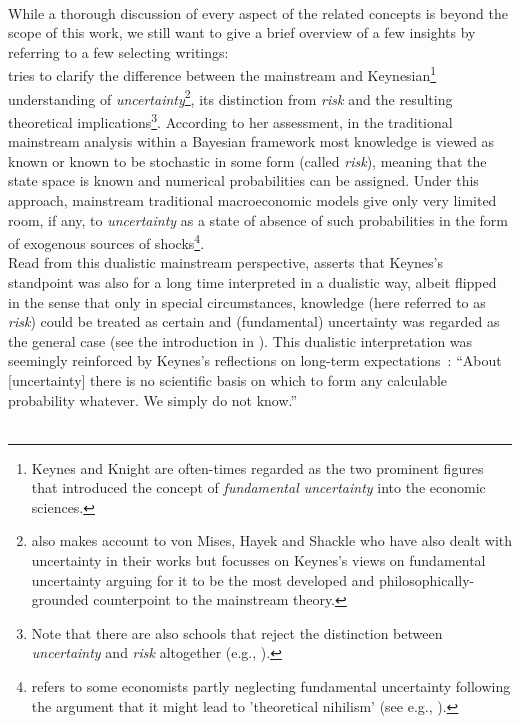 \documentclass[a4paper,11pt,listof=nochaptergap,oneside,pointednumbers,bibtotoc,bigheadings,liststotoc]{scrbook}
\newcommand{\forceindent}{\leavevmode{\parindent=1em\indent}}
\begin{document}
\\
While a thorough discussion of every aspect of the related concepts is beyond the scope of this work, we still want to give a brief overview of a few insights by referring to a few selecting writings:\\
\forceindent \citet{dow:16} tries to clarify the difference between the mainstream and Keynesian\footnote{Keynes and Knight are often-times regarded as the two prominent figures that introduced the concept of \textit{fundamental uncertainty} into the economic sciences.} understanding of \textit{uncertainty}\footnote{\citet{dow:16} also makes account to von Mises, Hayek and Shackle who have also dealt with uncertainty in their works but focusses on Keynes's views on fundamental uncertainty arguing for it to be the most developed and philosophically-grounded counterpoint to the mainstream theory.}, its distinction from \textit{risk} and the resulting theoretical implications\footnote{Note that there are also schools that reject the distinction between \textit{uncertainty} and \textit{risk} altogether (e.g., \citealp{savage:54}).}. According to her assessment, in the traditional mainstream analysis within a Bayesian framework most knowledge is viewed as known or known to be stochastic in some form (called \textit{risk}), meaning that the state space is known and numerical probabilities can be assigned. Under this approach, mainstream traditional macroeconomic models give only very limited room, if any, to \textit{uncertainty} as a state of absence of such probabilities in the form of exogenous sources of shocks\footnote{\citet[p. 43]{dequesh:00} refers to some economists partly neglecting fundamental uncertainty following the argument that it might lead to 'theoretical nihilism' (see e.g., \citealp{coddington:82}).}. \\
Read from this dualistic mainstream perspective, \citet{dow:16} asserts that Keynes's standpoint was also for a long time interpreted in a dualistic way, albeit flipped in the sense that only in special circumstances, knowledge (here referred to as \textit{risk}) could be treated as certain and (fundamental) uncertainty was regarded as the general case (see the introduction in \citealp{keynes:21}). This dualistic interpretation was seemingly reinforced by Keynes's reflections on long-term expectations~\citep[p. 214/214]{keynes:37}: 
``About [uncertainty] there is no scientific basis on which to form any calculable probability whatever. We simply do not know.''\\
\\
\end{document}
